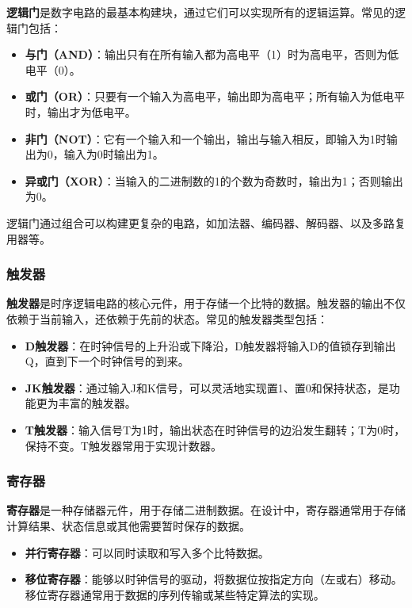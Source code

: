 \textbf{逻辑门}是数字电路的最基本构建块，通过它们可以实现所有的逻辑运算。常见的逻辑门包括：

\begin{itemize}
\tightlist
\item
  \textbf{与门（AND）}：输出只有在所有输入都为高电平（1）时为高电平，否则为低电平（0）。
\item
  \textbf{或门（OR）}：只要有一个输入为高电平，输出即为高电平；所有输入为低电平时，输出才为低电平。
\item
  \textbf{非门（NOT）}：它有一个输入和一个输出，输出与输入相反，即输入为1时输出为0，输入为0时输出为1。
\item
  \textbf{异或门（XOR）}：当输入的二进制数的1的个数为奇数时，输出为1；否则输出为0。
\end{itemize}

逻辑门通过组合可以构建更复杂的电路，如加法器、编码器、解码器、以及多路复用器等。

\subsubsection{触发器}\label{sec:03-digital-logic-014}

\textbf{触发器}是时序逻辑电路的核心元件，用于存储一个比特的数据。触发器的输出不仅依赖于当前输入，还依赖于先前的状态。常见的触发器类型包括：

\begin{itemize}
\tightlist
\item
  \textbf{D触发器}：在时钟信号的上升沿或下降沿，D触发器将输入D的值锁存到输出Q，直到下一个时钟信号的到来。
\item
  \textbf{JK触发器}：通过输入J和K信号，可以灵活地实现置1、置0和保持状态，是功能更为丰富的触发器。
\item
  \textbf{T触发器}：输入信号T为1时，输出状态在时钟信号的边沿发生翻转；T为0时，保持不变。T触发器常用于实现计数器。
\end{itemize}

\subsubsection{寄存器}\label{sec:03-digital-logic-015}

\textbf{寄存器}是一种存储器元件，用于存储二进制数据。在设计中，寄存器通常用于存储计算结果、状态信息或其他需要暂时保存的数据。

\begin{itemize}
\tightlist
\item
  \textbf{并行寄存器}：可以同时读取和写入多个比特数据。
\item
  \textbf{移位寄存器}：能够以时钟信号的驱动，将数据位按指定方向（左或右）移动。移位寄存器通常用于数据的序列传输或某些特定算法的实现。
\end{itemize}


